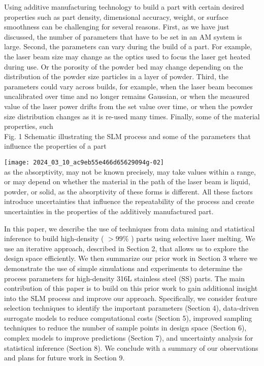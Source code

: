 \documentclass[10pt]{article}
\begin{document}
Using additive manufacturing technology to build a part with certain desired properties such as part density, dimensional accuracy, weight, or surface smoothness can be challenging for several reasons. First, as we have just discussed, the number of parameters that have to be set in an AM system is large. Second, the parameters can vary during the build of a part. For example, the laser beam size may change as the optics used to focus the laser get heated during use. Or the porosity of the powder bed may change depending on the distribution of the powder size particles in a layer of powder. Third, the parameters could vary across builds, for example, when the laser beam becomes uncalibrated over time and no longer remains Gaussian, or when the measured value of the laser power drifts from the set value over time, or when the powder size distribution changes as it is re-used many times. Finally, some of the material properties, such\\
Fig. 1 Schematic illustrating the SLM process and some of the parameters that influence the properties of a part

\texttt{[image: 2024\_03\_10\_ac9eb55e466d65629094g-02]}\\
as the absorptivity, may not be known precisely, may take values within a range, or may depend on whether the material in the path of the laser beam is liquid, powder, or solid, as the absorptivity of these forms is different. All these factors introduce uncertainties that influence the repeatability of the process and create uncertainties in the properties of the additively manufactured part.

In this paper, we describe the use of techniques from data mining and statistical inference to build high-density ( $>99 \%$ ) parts using selective laser melting. We use an iterative approach, described in Section 2, that allows us to explore the design space efficiently. We then summarize our prior work in Section 3 where we demonstrate the use of simple simulations and experiments to determine the process parameters for high-density 316L stainless steel (SS) parts. The main contribution of this paper is to build on this prior work to gain additional insight into the SLM process and improve our approach. Specifically, we consider feature selection techniques to identify the important parameters (Section 4), data-driven surrogate models to reduce computational costs (Section 5), improved sampling techniques to reduce the number of sample points in design space (Section 6), complex models to improve predictions (Section 7), and uncertainty analysis for statistical inference (Section 8). We conclude with a summary of our observations and plans for future work in Section 9.
\end{document}
